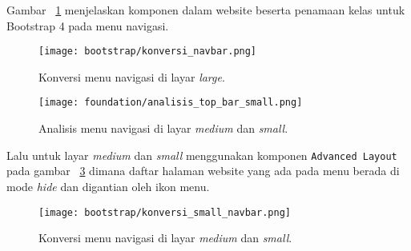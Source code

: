 \noindent Gambar ~\ref{fig:konversiNavigasi} menjelaskan komponen dalam website beserta penamaan kelas untuk Bootstrap 4 pada menu navigasi.\\
\begin{figure} [H]
	\centering  
	\texttt{[image: bootstrap/konversi\_navbar.png]}  
	\caption{Konversi menu navigasi di layar \textit{large}.} 
	\label{fig:konversiNavigasi}
\end{figure}

\begin{figure} [H]
	\centering  
	\texttt{[image: foundation/analisis\_top\_bar\_small.png]} 
	\caption{Analisis menu navigasi di layar \textit{medium} dan \textit{small}.} 
	\label{fig:navFoundation}
\end{figure} \noindent

\noindent Lalu untuk layar \textit{medium} dan \textit{small} menggunakan komponen \texttt{Advanced Layout} pada gambar ~\ref{fig:navBootstrap} dimana  daftar halaman website yang ada pada menu berada di mode \textit{hide} dan digantian oleh ikon menu. 
\begin{figure} [H]
	\centering  
	\texttt{[image: bootstrap/konversi\_small\_navbar.png]} 
	\caption{Konversi menu navigasi di layar \textit{medium} dan \textit{small}.} 
	\label{fig:navBootstrap}
\end{figure} \noindent


